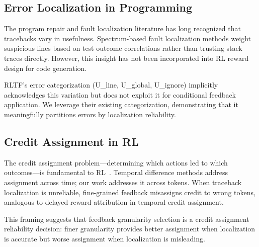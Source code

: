 \subsection{Error Localization in Programming}

The program repair and fault localization literature has long recognized that tracebacks vary in usefulness. Spectrum-based fault localization methods weight suspicious lines based on test outcome correlations rather than trusting stack traces directly. However, this insight has not been incorporated into RL reward design for code generation.

RLTF's error categorization (U\_line, U\_global, U\_ignore) implicitly acknowledges this variation but does not exploit it for conditional feedback application. We leverage their existing categorization, demonstrating that it meaningfully partitions errors by localization reliability.

\subsection{Credit Assignment in RL}

The credit assignment problem---determining which actions led to which outcomes---is fundamental to RL~\cite{minsky1961steps}. Temporal difference methods address assignment across time; our work addresses it across tokens. When traceback localization is unreliable, fine-grained feedback misassigns credit to wrong tokens, analogous to delayed reward attribution in temporal credit assignment.

This framing suggests that feedback granularity selection is a credit assignment reliability decision: finer granularity provides better assignment when localization is accurate but worse assignment when localization is misleading.
